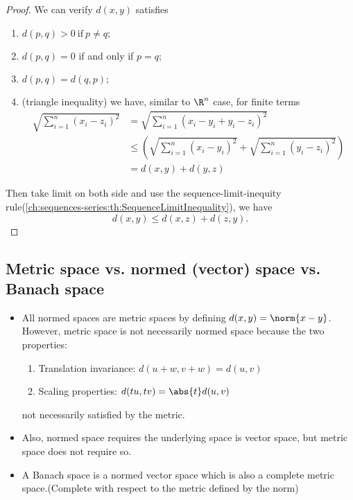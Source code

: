 \begin{refsection}
\begin{proof}
	We can verify $d(x,y)$ satisfies
	\begin{enumerate}
		\item $d(p,q) > 0 ~\text{if}~ p \neq q;$
		\item  $d(p,q)=0$ if and only if $p=q$;
		\item $d(p,q) = d(q,p);$
		\item (triangle inequality)  we have, similar to $\R^n$ case, for finite terms
		\begin{align*}
		\sqrt{\sum_{i=1}^n (x_i - z_i)^2} &= \sqrt{\sum_{i=1}^n (x_i - y_i + y_i- z_i)^2} \\	
		& \leq (\sqrt{\sum_{i=1}^n (x_i - y_i)^2}+\sqrt{\sum_{i=1}^n (y_i - z_i)^2}) \\
		& = d(x,y) + d(y,z)
		\end{align*}
	\end{enumerate}
	
	Then take limit on both side and use the sequence-limit-inequity rule(\autoref{ch:sequences-series:th:SequenceLimitInequality}), we have
	$$d(x,y)\leq d(x,z) + d(z,y).$$
\end{proof}

\subsection{Metric space vs. normed (vector) space vs. Banach space}
\begin{note}\hfill
\begin{itemize}
	\item All normed spaces are metric spaces by defining $d(x,y)=\norm{x-y}$. However, metric space is not necessarily normed space because the two properties:
	\begin{enumerate}
		\item Translation invariance: $d(u+w,v+w) = d(u,v)$
		\item Scaling properties: $d(tu,tv)=\abs{t}d(u,v)$
	\end{enumerate}
	not necessarily satisfied by the metric. 
	\item Also, normed space requires the underlying space is vector space, but metric space does not require so.\cite{kreyszig1989introductory}
	\item A Banach space is a normed vector space which is also a complete metric space.(Complete with respect to the metric defined by the norm)
\end{itemize}	
\end{note}





\end{refsection}
